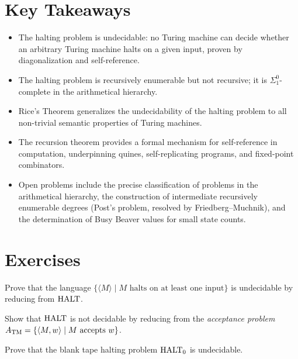 \section*{Key Takeaways}
\begin{itemize}
\item The halting problem is undecidable: no Turing machine can decide whether an arbitrary Turing machine halts on a given input, proven by diagonalization and self-reference.
\item The halting problem is recursively enumerable but not recursive; it is $\Sigma^0_1$-complete in the arithmetical hierarchy.
\item Rice's Theorem generalizes the undecidability of the halting problem to all non-trivial semantic properties of Turing machines.
\item The recursion theorem provides a formal mechanism for self-reference in computation, underpinning quines, self-replicating programs, and fixed-point combinators.
\item Open problems include the precise classification of problems in the arithmetical hierarchy, the construction of intermediate recursively enumerable degrees (Post's problem, resolved by Friedberg--Muchnik), and the determination of Busy Beaver values for small state counts.
\end{itemize}

\section{Exercises}
\label{sec:halting:exercises}

\begin{exercise}[Basic]
Prove that the language $\{ \langle M \rangle \mid M \text{ halts on at least one input} \}$ is undecidable by reducing from $\text{HALT}$.
\end{exercise}

\begin{exercise}[Basic]
Show that $\text{HALT}$ is not decidable by reducing from the \emph{acceptance problem} $A_{\text{TM}} = \{ \langle M, w \rangle \mid M \text{ accepts } w \}$.
\end{exercise}

\begin{exercise}[Basic]
Prove that the blank tape halting problem $\text{HALT}_0$ is undecidable.
\end{exercise}

